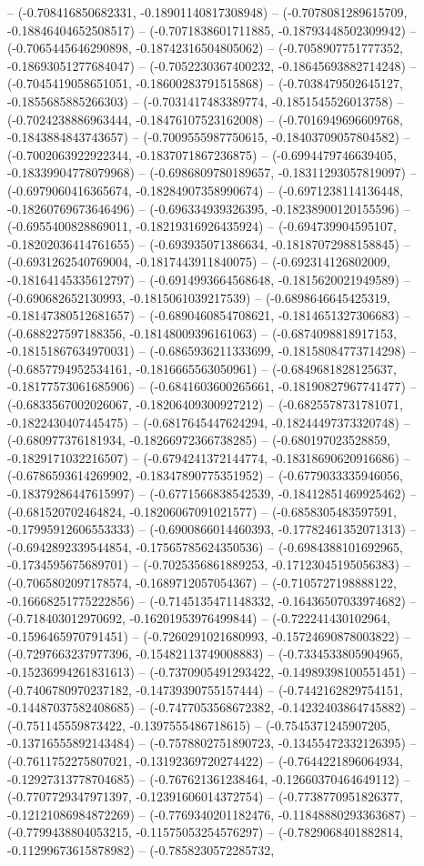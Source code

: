 -- (-0.708416850682331, -0.18901140817308948) -- (-0.7078081289615709, -0.18846404652508517) -- (-0.7071838601711885, -0.18793448502309942) -- (-0.7065445646290898, -0.18742316504805062) -- (-0.7058907751777352, -0.18693051277684047) -- (-0.7052230367400232, -0.18645693882714248) -- (-0.7045419058651051, -0.18600283791515868) -- (-0.7038479502645127, -0.1855685885266303) -- (-0.7031417483389774, -0.1851545526013758) -- (-0.7024238886963444, -0.18476107523162008) -- (-0.7016949696609768, -0.1843884843743657) -- (-0.7009555987750615, -0.18403709057804582) -- (-0.7002063922922344, -0.1837071867236875) -- (-0.6994479746639405, -0.18339904778079968) -- (-0.6986809780189657, -0.18311293057819097) -- (-0.6979060416365674, -0.18284907358990674) -- (-0.6971238114136448, -0.18260769673646496) -- (-0.696334939326395, -0.18238900120155596) -- (-0.6955400828869011, -0.18219316926435924) -- (-0.694739904595107, -0.18202036414761655) -- (-0.693935071386634, -0.18187072988158845) -- (-0.6931262540769004, -0.1817443911840075) -- (-0.692314126802009, -0.18164145335612797) -- (-0.6914993664568648, -0.1815620021949589) -- (-0.690682652130993, -0.1815061039217539) -- (-0.6898646645425319, -0.18147380512681657) -- (-0.6890460854708621, -0.1814651327306683) -- (-0.688227597188356, -0.18148009396161063) -- (-0.6874098818917153, -0.18151867634970031) -- (-0.6865936211333699, -0.18158084773714298) -- (-0.6857794952534161, -0.1816665563050961) -- (-0.6849681828125637, -0.18177573061685906) -- (-0.6841603600265661, -0.18190827967741477) -- (-0.6833567002026067, -0.18206409300927212) -- (-0.6825578731781071, -0.1822430407445475) -- (-0.6817645447624294, -0.18244497373320748) -- (-0.680977376181934, -0.18266972366738285) -- (-0.680197023528859, -0.1829171032216507) -- (-0.6794241372144774, -0.18318690620916686) -- (-0.6786593614269902, -0.18347890775351952) -- (-0.6779033335946056, -0.18379286447615997) -- (-0.6771566838542539, -0.18412851469925462) -- (-0.681520702464824, -0.18206067091021577) -- (-0.6858305483597591, -0.17995912606553333) -- (-0.6900866014460393, -0.17782461352071313) -- (-0.6942892339544854, -0.17565785624350536) -- (-0.6984388101692965, -0.1734595675689701) -- (-0.7025356861889253, -0.17123045195056383) -- (-0.7065802097178574, -0.1689712057054367) -- (-0.7105727198888122, -0.16668251775222856) -- (-0.7145135471148332, -0.16436507033974682) -- (-0.718403012970692, -0.16201953976499844) -- (-0.722241430102964, -0.1596465970791451) -- (-0.7260291021680993, -0.15724690878003822) -- (-0.7297663237977396, -0.15482113749008883) -- (-0.7334533805904965, -0.15236994261831613) -- (-0.7370905491293422, -0.14989398100551451) -- (-0.7406780970237182, -0.14739390755157444) -- (-0.7442162829754151, -0.14487037582408685) -- (-0.7477053568672382, -0.14232403864745882) -- (-0.751145559873422, -0.1397555486718615) -- (-0.7545371245907205, -0.13716555892143484) -- (-0.7578802751890723, -0.13455472332126395) -- (-0.7611752275807021, -0.13192369720274422) -- (-0.7644221896064934, -0.12927313778704685) -- (-0.767621361238464, -0.12660370464649112) -- (-0.7707729347971397, -0.12391606014372754) -- (-0.7738770951826377, -0.12121086984872269) -- (-0.7769340201182476, -0.11848880293363687) -- (-0.7799438804053215, -0.11575053254576297) -- (-0.7829068401882814, -0.11299673615878982) -- (-0.7858230572285732, 